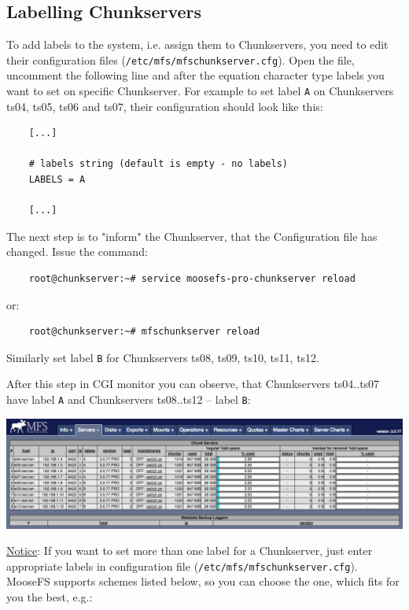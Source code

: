 \documentclass[a4paper,11pt,english]{report}
\def\code#1{\texttt{#1}}
\begin{document}
			\subsection{Labelling Chunkservers}
			To add labels to the system, i.e. assign them to Chunkservers, you need to edit their configuration files (\code{/etc/mfs/mfschunkserver.cfg}). Open the file, uncomment the following line and after the equation character type labels you want to set on specific Chunkserver. For example to set label \code{A} on Chunkservers ts04, ts05, ts06 and ts07, their configuration should look like this:
			
			\begin{lstlisting}
	[...]
	
	# labels string (default is empty - no labels)
	LABELS = A
	
	[...]
			\end{lstlisting}
			
			
			The next step is to "inform" the Chunkserver, that the Configuration file has changed. Issue the command:
			\begin{lstlisting}
	root@chunkserver:~# service moosefs-pro-chunkserver reload
			\end{lstlisting}
			
			or:
			\begin{lstlisting}
	root@chunkserver:~# mfschunkserver reload
			\end{lstlisting}
			
	
			Similarly set label \code{B} for Chunkservers ts08, ts09, ts10, ts11, ts12.		
			
			After this step in CGI monitor you can observe, that Chunkservers ts04..ts07 have label \code{A} and Chunkservers ts08..ts12 -- label \code{B}:
			
			\bigskip
			\includegraphics[width=1.0\textwidth]{images/cgi_labelsAB.png}
	
			\bigskip
					
			\underline{Notice}: If you want to set more than one label for a Chunkserver, just enter appropriate labels in configuration file (\code{/etc/mfs/mfschunkserver.cfg}). MooseFS supports schemes listed below, so you can choose the one, which fits for you the best, e.g.:
			
\end{document}
